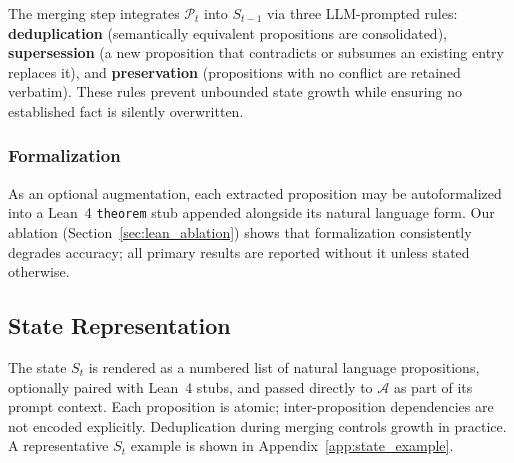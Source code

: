 The merging step integrates $\mathcal{P}_t$ into $S_{t-1}$ via three LLM-prompted rules: \textbf{deduplication} (semantically equivalent propositions are consolidated), \textbf{supersession} (a new proposition that contradicts or subsumes an existing entry replaces it), and \textbf{preservation} (propositions with no conflict are retained verbatim). These rules prevent unbounded state growth while ensuring no established fact is silently overwritten.

\subsubsection{Formalization}

As an optional augmentation, each extracted proposition may be autoformalized into a Lean~4 \texttt{theorem} stub appended alongside its natural language form. Our ablation (Section~\ref{sec:lean_ablation}) shows that formalization consistently degrades accuracy; all primary results are reported without it unless stated otherwise.

\subsection{State Representation}\label{sec:state}

The state $S_t$ is rendered as a numbered list of natural language propositions, optionally paired with Lean~4 stubs, and passed directly to $\mathcal{A}$ as part of its prompt context. Each proposition is atomic; inter-proposition dependencies are not encoded explicitly. Deduplication during merging controls growth in practice. A representative $S_t$ example is shown in Appendix~\ref{app:state_example}.
